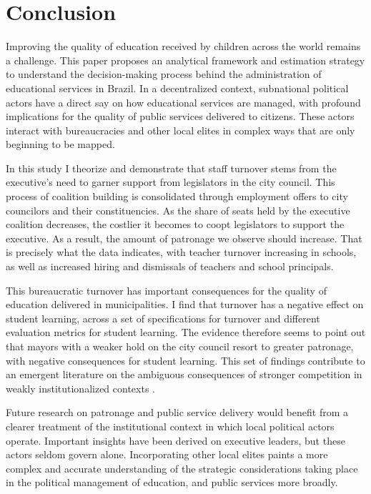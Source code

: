 \documentclass[12pt,a4paper]{article}
\begin{document}
\section{Conclusion}
\label{sec:conclusion}

Improving the quality of education received by children across the world remains a challenge. This paper proposes an analytical framework and estimation strategy to understand the decision-making process behind the administration of educational services in Brazil. In a decentralized context, subnational political actors have a direct say on how educational services are managed, with profound implications for the quality of public services delivered to citizens. These actors interact with bureaucracies and other local elites in complex ways that are only beginning to be mapped.

In this study I theorize and demonstrate that staff turnover stems from the executive's need to garner support from legislators in the city council. This process of coalition building is consolidated through employment offers to city councilors and their constituencies. As the share of seats held by the executive coalition decreases, the costlier it becomes to coopt legislators to support the executive. As a result, the amount of patronage we observe should increase. That is precisely what the data indicates, with teacher turnover increasing in schools, as well as increased hiring and dismissals of teachers and school principals.

This bureaucratic turnover has important consequences for the quality of education delivered in municipalities. I find that turnover has a negative effect on student learning, across a set of specifications for turnover and different evaluation metrics for student learning. The evidence therefore seems to point out that mayors with a weaker hold on the city council resort to greater patronage, with negative consequences for student learning. This set of findings contribute to an emergent literature on the ambiguous consequences of stronger competition in weakly institutionalized contexts \citep{gottlieb_countervailing_2019}.

Future research on patronage and public service delivery would benefit from a clearer treatment of the institutional context in which local political actors operate. Important insights have been derived on executive leaders, but these actors seldom govern alone. Incorporating other local elites paints a more complex and accurate understanding of the strategic considerations taking place in the political management of education, and public services more broadly.
\end{document}
